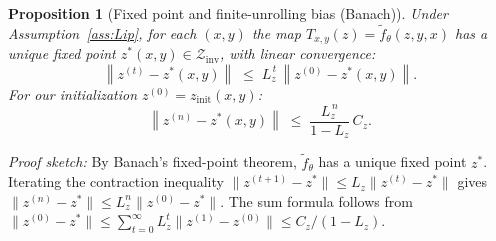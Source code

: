\documentclass{article}
\theoremstyle{plain}
\newtheorem{proposition}[theorem]{Proposition}
\theoremstyle{definition}
\theoremstyle{remark}
\newtheorem{remark}[theorem]{Remark}
\newcommand{\longonly}[1]{}
\newcommand{\longonly}[1]{#1}
\newcommand{\norm}[1]{\left\lVert #1 \right\rVert}
\begin{document}
{\begin{proposition}[Fixed point and finite-unrolling bias (Banach)]
\label{prop:banach}
Under Assumption~\ref{ass:Lip}, for each $(x,y)$ the map $T_{x,y}(z)=\tilde f_\theta(z,y,x)$ has a unique fixed point $z^*(x,y) \in \mathcal{Z}_{\mathrm{inv}}$, with linear convergence:
\begin{equation}
\norm{z^{(t)} - z^*(x,y)}
\;\le\;
L_z^{\,t}\,\norm{z^{(0)} - z^*(x,y)}.
\label{eq:linear_convergence}
\end{equation}
For our initialization $z^{(0)} = z_{\mathrm{init}}(x,y)$:
\begin{equation}
\norm{z^{(n)}-z^*(x,y)}
\;\le\;
\frac{L_z^{\,n}}{1-L_z}\,C_z.
\label{eq:finite_unrolling_bias}
\end{equation}
\end{proposition}
\emph{Proof sketch:} By Banach's fixed-point theorem, $\tilde f_\theta$ has a unique fixed point $z^*$. Iterating the contraction inequality $\|z^{(t+1)} - z^*\| \le L_z \|z^{(t)} - z^*\|$ gives $\|z^{(n)} - z^*\| \le L_z^n \|z^{(0)} - z^*\|$. The sum formula follows from $\|z^{(0)} - z^*\| \le \sum_{t=0}^\infty L_z^t \|z^{(1)} - z^{(0)}\| \le C_z/(1-L_z)$.

\longonly{
\begin{remark}[Trade-off: contraction strength vs.\ convergence speed]
\label{rem:tradeoff}
If $L_z$ is close to 1, the bound $\frac{L_z^n}{1-L_z}C_z$ becomes large, requiring more unrolling steps $n$ to achieve small bias.
Stronger contraction (smaller $L_z$) yields faster convergence but may limit the expressivity of the latent dynamics.
\end{remark}}

}
\end{document}

